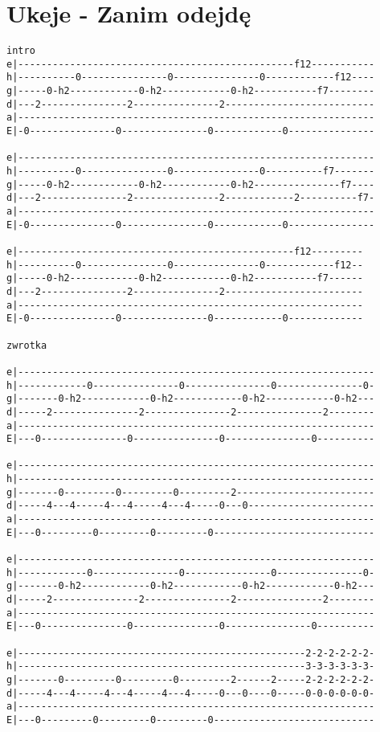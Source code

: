 \section{Ukeje - Zanim odejdę}
\begin{verbatim}
intro
e|------------------------------------------------f12-----------
h|----------0---------------0---------------0------------f12----
g|-----0-h2------------0-h2------------0-h2-----------f7--------
d|---2---------------2---------------2--------------------------
a|--------------------------------------------------------------
E|-0---------------0---------------0------------0---------------

e|--------------------------------------------------------------
h|----------0---------------0---------------0----------f7-------
g|-----0-h2------------0-h2------------0-h2---------------f7----
d|---2---------------2---------------2------------2----------f7-
a|--------------------------------------------------------------
E|-0---------------0---------------0------------0---------------

e|------------------------------------------------f12---------
h|----------0---------------0---------------0------------f12--
g|-----0-h2------------0-h2------------0-h2-----------f7------
d|---2---------------2---------------2------------------------
a|------------------------------------------------------------
E|-0---------------0---------------0------------0-------------

zwrotka

e|--------------------------------------------------------------
h|------------0---------------0---------------0---------------0-
g|-------0-h2------------0-h2------------0-h2------------0-h2---
d|-----2---------------2---------------2---------------2--------
a|--------------------------------------------------------------
E|---0---------------0---------------0---------------0----------
 
e|--------------------------------------------------------------
h|--------------------------------------------------------------
g|-------0---------0---------0---------2------------------------
d|-----4---4-----4---4-----4---4-----0---0----------------------
a|--------------------------------------------------------------
E|---0---------0---------0---------0----------------------------
 
e|--------------------------------------------------------------
h|------------0---------------0---------------0---------------0-
g|-------0-h2------------0-h2------------0-h2------------0-h2---
d|-----2---------------2---------------2---------------2--------
a|--------------------------------------------------------------
E|---0---------------0---------------0---------------0----------
 
e|--------------------------------------------------2-2-2-2-2-2-
h|--------------------------------------------------3-3-3-3-3-3-
g|-------0---------0---------0---------2------2-----2-2-2-2-2-2-
d|-----4---4-----4---4-----4---4-----0---0----0-----0-0-0-0-0-0-
a|--------------------------------------------------------------
E|---0---------0---------0---------0----------------------------
\end{verbatim}
